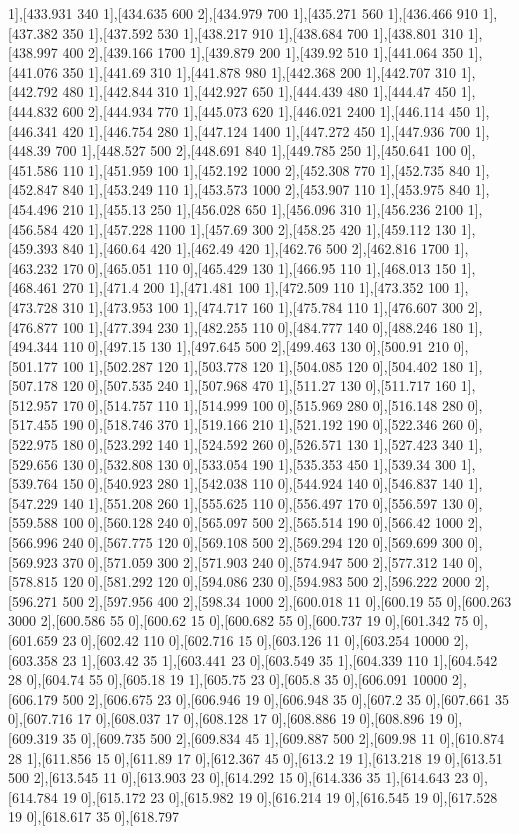 {1],[433.931 340 1],[434.635 600 2],[434.979 700 1],[435.271 560 1],[436.466 910 1],[437.382 350 1],[437.592 530 1],[438.217 910 1],[438.684 700 1],[438.801 310 1],[438.997 400 2],[439.166 1700 1],[439.879 200 1],[439.92 510 1],[441.064 350 1],[441.076 350 1],[441.69 310 1],[441.878 980 1],[442.368 200 1],[442.707 310 1],[442.792 480 1],[442.844 310 1],[442.927 650 1],[444.439 480 1],[444.47 450 1],[444.832 600 2],[444.934 770 1],[445.073 620 1],[446.021 2400 1],[446.114 450 1],[446.341 420 1],[446.754 280 1],[447.124 1400 1],[447.272 450 1],[447.936 700 1],[448.39 700 1],[448.527 500 2],[448.691 840 1],[449.785 250 1],[450.641 100 0],[451.586 110 1],[451.959 100 1],[452.192 1000 2],[452.308 770 1],[452.735 840 1],[452.847 840 1],[453.249 110 1],[453.573 1000 2],[453.907 110 1],[453.975 840 1],[454.496 210 1],[455.13 250 1],[456.028 650 1],[456.096 310 1],[456.236 2100 1],[456.584 420 1],[457.228 1100 1],[457.69 300 2],[458.25 420 1],[459.112 130 1],[459.393 840 1],[460.64 420 1],[462.49 420 1],[462.76 500 2],[462.816 1700 1],[463.232 170 0],[465.051 110 0],[465.429 130 1],[466.95 110 1],[468.013 150 1],[468.461 270 1],[471.4 200 1],[471.481 100 1],[472.509 110 1],[473.352 100 1],[473.728 310 1],[473.953 100 1],[474.717 160 1],[475.784 110 1],[476.607 300 2],[476.877 100 1],[477.394 230 1],[482.255 110 0],[484.777 140 0],[488.246 180 1],[494.344 110 0],[497.15 130 1],[497.645 500 2],[499.463 130 0],[500.91 210 0],[501.177 100 1],[502.287 120 1],[503.778 120 1],[504.085 120 0],[504.402 180 1],[507.178 120 0],[507.535 240 1],[507.968 470 1],[511.27 130 0],[511.717 160 1],[512.957 170 0],[514.757 110 1],[514.999 100 0],[515.969 280 0],[516.148 280 0],[517.455 190 0],[518.746 370 1],[519.166 210 1],[521.192 190 0],[522.346 260 0],[522.975 180 0],[523.292 140 1],[524.592 260 0],[526.571 130 1],[527.423 340 1],[529.656 130 0],[532.808 130 0],[533.054 190 1],[535.353 450 1],[539.34 300 1],[539.764 150 0],[540.923 280 1],[542.038 110 0],[544.924 140 0],[546.837 140 1],[547.229 140 1],[551.208 260 1],[555.625 110 0],[556.497 170 0],[556.597 130 0],[559.588 100 0],[560.128 240 0],[565.097 500 2],[565.514 190 0],[566.42 1000 2],[566.996 240 0],[567.775 120 0],[569.108 500 2],[569.294 120 0],[569.699 300 0],[569.923 370 0],[571.059 300 2],[571.903 240 0],[574.947 500 2],[577.312 140 0],[578.815 120 0],[581.292 120 0],[594.086 230 0],[594.983 500 2],[596.222 2000 2],[596.271 500 2],[597.956 400 2],[598.34 1000 2],[600.018 11 0],[600.19 55 0],[600.263 3000 2],[600.586 55 0],[600.62 15 0],[600.682 55 0],[600.737 19 0],[601.342 75 0],[601.659 23 0],[602.42 110 0],[602.716 15 0],[603.126 11 0],[603.254 10000 2],[603.358 23 1],[603.42 35 1],[603.441 23 0],[603.549 35 1],[604.339 110 1],[604.542 28 0],[604.74 55 0],[605.18 19 1],[605.75 23 0],[605.8 35 0],[606.091 10000 2],[606.179 500 2],[606.675 23 0],[606.946 19 0],[606.948 35 0],[607.2 35 0],[607.661 35 0],[607.716 17 0],[608.037 17 0],[608.128 17 0],[608.886 19 0],[608.896 19 0],[609.319 35 0],[609.735 500 2],[609.834 45 1],[609.887 500 2],[609.98 11 0],[610.874 28 1],[611.856 15 0],[611.89 17 0],[612.367 45 0],[613.2 19 1],[613.218 19 0],[613.51 500 2],[613.545 11 0],[613.903 23 0],[614.292 15 0],[614.336 35 1],[614.643 23 0],[614.784 19 0],[615.172 23 0],[615.982 19 0],[616.214 19 0],[616.545 19 0],[617.528 19 0],[618.617 35 0],[618.797 }
